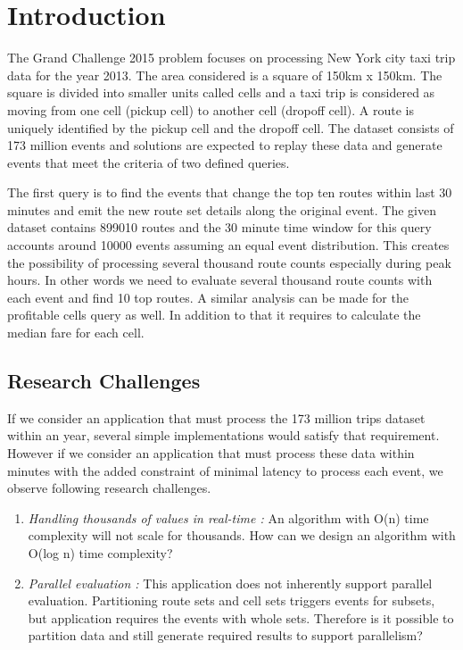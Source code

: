 \section{Introduction}

The Grand Challenge 2015 problem focuses on processing New York city taxi trip data for the year 2013. The area considered is a square of 150km x  150km. The  square is divided into smaller units called cells and a taxi trip is considered as moving from one cell (pickup cell) to another cell (dropoff cell). A route is uniquely identified by the pickup cell and the dropoff cell. The dataset consists of 173 million events and solutions are expected to replay these data and generate events that meet the criteria of two defined queries. 

The first query is to find the events that change the top ten routes within last 30 minutes and emit the new route set details along the original event. The given dataset contains 899010 routes and the 30 minute time window for this query accounts around 10000 events assuming an equal event distribution. This creates the possibility of processing several thousand route counts especially during peak hours. In other words we need to evaluate several thousand route counts with each event and find 10 top routes. A similar analysis can be made for the profitable cells query as well. In addition to that it requires to calculate the median fare for each cell. 

\subsection{Research Challenges}

If we consider an application that must process the 173 million trips dataset within an year, several simple implementations would satisfy that requirement. However if we consider an application that must process these data within minutes with the added constraint of minimal latency to process each event, we observe following research challenges.
\begin{enumerate}
	\item \textit{Handling thousands of values in real-time :}  An algorithm with O(n) time complexity will not scale for thousands. How can we design an algorithm with O(log n) time complexity?
	\item \textit{Parallel evaluation :}  This application does not inherently support parallel evaluation. Partitioning route sets and cell sets triggers events for subsets, but application requires the events with whole sets. Therefore is it possible to partition data and still generate required results to support parallelism?  
\end{enumerate}

